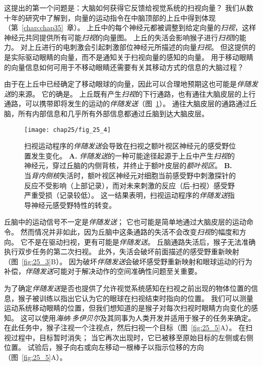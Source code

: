 这提出的第一个问题是：大脑如何获得它反馈给视觉系统的扫视向量？
我们从数十年的研究中了解到，向量的运动指令在中脑顶部的上丘中得到体现（第~\ref{chap:chap35}~章）。
上丘中的每个神经元都被调整到给定向量的\textit{扫视}，这样神经元共同提供所有可能\textit{扫视}的向量图。
上丘的失活会影响猴子进行\textit{扫视}的能力。
对上丘进行的电刺激会引起刺激部位神经元所描述的向量\textit{扫视}。 
但这提供的是实际驱动眼睛的向量，而不是通知关于扫视向量的感知的向量。
用于移动眼睛的向量信息如何可用于不移动眼睛还需要有关其移动方式的信息的大脑过程？


由于在上丘中已经确定了移动眼球的向量，因此可以合理地预期这也可能是\textit{伴随发送}的来源。
它的确是。
上丘既有产生\textit{扫视}的下行通路，也有通往大脑皮层的上行通路，可以携带即将发生的运动的\textit{伴随发送}（图~\ref{fig:25_4}）。
通往大脑皮层的通路通过丘脑，所有内部信息和几乎所有外部信息都通过丘脑到达大脑皮层。


\begin{figure}[htbp]
	\centering
	\texttt{[image: chap25/fig\_25\_4]}
	\caption{扫视运动程序的\textit{伴随发送}会导致在扫视之额叶视区神经元的感受野位置发生变化\cite{sommer2008brain}。
		\textbf{A.} \textit{伴随发送}的一种可能途径起源于上丘中产生\textit{扫视}的神经元，穿过丘脑的内侧背核，并终止于额叶皮层的\textit{额叶视区}。
		\textbf{B.} 当\textit{背内侧核}失活时，额叶视区神经元对细胞当前感受野中刺激探针的反应不受影响（上部记录），而对未来刺激的反应（后-扫视）感受野严重受损（记录较低）。
		这一结果表明，扫视运动程序的\textit{伴随发送}指导神经元感受野特性的转变。}
	\label{fig:25_4}
\end{figure}


丘脑中的运动信号不一定是\textit{伴随发送}；
它也可能是简单地通过大脑皮层的运动命令。
然而情况并非如此，因为丘脑中这条通路的失活不会改变\textit{扫视}的幅度和方向。
它不是在驱动扫视，更有可能是\textit{伴随发送}。
丘脑通路失活后，猴子无法准确执行双步任务的第二次扫视。
此外，失活会破坏前面描述的感受野重新映射（图~\ref{fig:25_3}B）。
因为破坏\textit{伴随发送}会破坏感受野重新映射和眼球运动的行为补偿，\textit{伴随发送}可能对于解决动作的空间准确性问题至关重要。


为了确定\textit{伴随发送}是否也提供了允许视觉系统感知在扫视之前出现的物体位置的信息，猴子被训练以指出它认为它的眼球在扫视结束时指向的位置。
我们可以测量运动系统移动眼睛的位置，但我们想知道的是猴子对每次扫视时眼睛方向变化的感知。
这可以使用\textit{海纳$\cdot$多伊贝尔}及其同事为人类开发并适用于猴子的任务来确定。
在此任务中，猴子注视一个注视点，然后扫视一个目标（图~\ref{fig:25_5}A）。
在扫视过程中，目标暂时消失；
当它再次出现时，它已被移至原始目标的左侧或右侧位置。
试验后，猴子向右或向左移动一根棒子以指示位移的方向（图~\ref{fig:25_5}A）。


